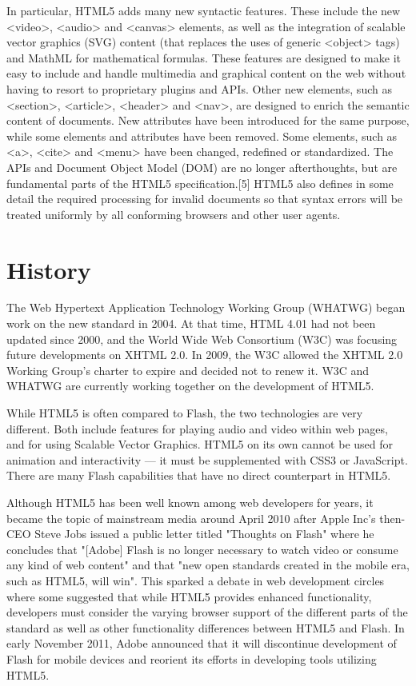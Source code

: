 In particular, HTML5 adds many new syntactic features. These include the new <video>, <audio> and <canvas> elements, as well as the integration of scalable vector graphics (SVG) content (that replaces the uses of generic <object> tags) and MathML for mathematical formulas. These features are designed to make it easy to include and handle multimedia and graphical content on the web without having to resort to proprietary plugins and APIs. Other new elements, such as <section>, <article>, <header> and <nav>, are designed to enrich the semantic content of documents. New attributes have been introduced for the same purpose, while some elements and attributes have been removed. Some elements, such as <a>, <cite> and <menu> have been changed, redefined or standardized. The APIs and Document Object Model (DOM) are no longer afterthoughts, but are fundamental parts of the HTML5 specification.[5] HTML5 also defines in some detail the required processing for invalid documents so that syntax errors will be treated uniformly by all conforming browsers and other user agents.

\chapter{History}

The Web Hypertext Application Technology Working Group (WHATWG) began work on the new standard in 2004. At that time, HTML 4.01 had not been updated since 2000, and the World Wide Web Consortium (W3C) was focusing future developments on XHTML 2.0. In 2009, the W3C allowed the XHTML 2.0 Working Group's charter to expire and decided not to renew it. W3C and WHATWG are currently working together on the development of HTML5.

While HTML5 is often compared to Flash, the two technologies are very different. Both include features for playing audio and video within web pages, and for using Scalable Vector Graphics. HTML5 on its own cannot be used for animation and interactivity — it must be supplemented with CSS3 or JavaScript. There are many Flash capabilities that have no direct counterpart in HTML5. 

Although HTML5 has been well known among web developers for years, it became the topic of mainstream media around April 2010 after Apple Inc's then-CEO Steve Jobs issued a public letter titled "Thoughts on Flash" where he concludes that "[Adobe] Flash is no longer necessary to watch video or consume any kind of web content" and that "new open standards created in the mobile era, such as HTML5, will win". This sparked a debate in web development circles where some suggested that while HTML5 provides enhanced functionality, developers must consider the varying browser support of the different parts of the standard as well as other functionality differences between HTML5 and Flash. In early November 2011, Adobe announced that it will discontinue development of Flash for mobile devices and reorient its efforts in developing tools utilizing HTML5.


